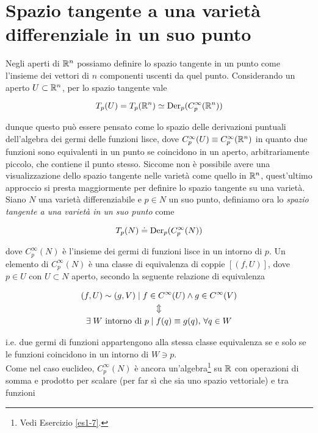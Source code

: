 \section{Spazio tangente a una varietà differenziale in un suo punto}

Negli aperti di $ \mathbb{R}^{n} $ possiamo definire lo spazio tangente in un punto come l'insieme dei vettori di $ n $ componenti uscenti da quel punto. Considerando un aperto $ U \subset \mathbb{R}^{n} $, per lo spazio tangente vale

\begin{equation}
	T_{p}(U) = T_{p}(\mathbb{R}^{n}) \simeq \operatorname{Der}_{p}(C_{p}^{\infty}(\mathbb{R}^{n}))
\end{equation}

dunque questo può essere pensato come lo spazio delle derivazioni puntuali dell'algebra dei germi delle funzioni lisce, dove $ C_{p}^{\infty}(U) \equiv C_{p}^{\infty}(\mathbb{R}^{n}) $ in quanto due funzioni sono equivalenti in un punto se coincidono in un aperto, arbitrariamente piccolo, che contiene il punto stesso. Siccome non è possibile avere una visualizzazione dello spazio tangente nelle varietà come quello in $ \mathbb{R}^{n} $, quest'ultimo approccio si presta maggiormente per definire lo spazio tangente su una varietà.\\
Siano $ N $ una varietà differenziabile e $ p \in N $ un suo punto, definiamo ora lo \textit{spazio tangente a una varietà in un suo punto} come

\begin{equation}
	T_{p}(N) \doteq \operatorname{Der}_{p}(C_{p}^{\infty}(N))
\end{equation}

dove $ C_{p}^{\infty}(N) $ è l'insieme dei germi di funzioni lisce in un intorno di $ p $. Un elemento di $ C_{p}^{\infty}(N) $ è una classe di equivalenza di coppie $ [(f,U)] $, dove $ p \in U $ con $ U \subset N $ aperto, secondo la seguente relazione di equivalenza

\begin{gather}
	(f,U) \sim (g,V) \mid f \in C^{\infty}(U) \wedge g \in C^{\infty}(V) \nonumber\\
	\Updownarrow\\
	\exists \; W \text{ intorno di } p \mid f(q) \equiv g(q) , \, \forall q \in W \nonumber
\end{gather}

i.e. due germi di funzioni appartengono alla stessa classe equivalenza se e solo se le funzioni coincidono in un intorno di $ W \ni p $.\\
Come nel caso euclideo, $ C_{p}^{\infty}(N) $ è ancora un'algebra\footnote{%
	Vedi Esercizio \ref{es1-7}.%
} su $ \mathbb{R} $ con operazioni di somma e prodotto per scalare (per far sì che sia uno spazio vettoriale) e tra funzioni

